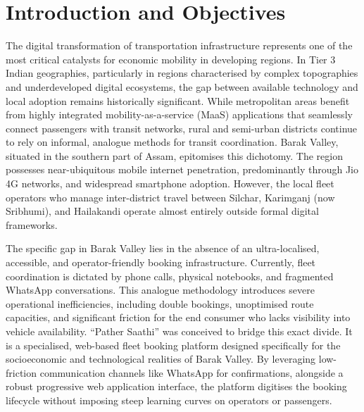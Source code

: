\documentclass[12pt,a4paper]{report}
\begin{document}
\tableofcontents
\newpage

\chapter{Introduction and Objectives}

The digital transformation of transportation infrastructure represents one of the most critical catalysts for economic mobility in developing regions. In Tier 3 Indian geographies, particularly in regions characterised by complex topographies and underdeveloped digital ecosystems, the gap between available technology and local adoption remains historically significant. While metropolitan areas benefit from highly integrated mobility-as-a-service (MaaS) applications that seamlessly connect passengers with transit networks, rural and semi-urban districts continue to rely on informal, analogue methods for transit coordination. Barak Valley, situated in the southern part of Assam, epitomises this dichotomy. The region possesses near-ubiquitous mobile internet penetration, predominantly through Jio 4G networks, and widespread smartphone adoption. However, the local fleet operators who manage inter-district travel between Silchar, Karimganj (now Sribhumi), and Hailakandi operate almost entirely outside formal digital frameworks.

The specific gap in Barak Valley lies in the absence of an ultra-localised, accessible, and operator-friendly booking infrastructure. Currently, fleet coordination is dictated by phone calls, physical notebooks, and fragmented WhatsApp conversations. This analogue methodology introduces severe operational inefficiencies, including double bookings, unoptimised route capacities, and significant friction for the end consumer who lacks visibility into vehicle availability. ``Pather Saathi'' was conceived to bridge this exact divide. It is a specialised, web-based fleet booking platform designed specifically for the socioeconomic and technological realities of Barak Valley. By leveraging low-friction communication channels like WhatsApp for confirmations, alongside a robust progressive web application interface, the platform digitises the booking lifecycle without imposing steep learning curves on operators or passengers.
\end{document}
